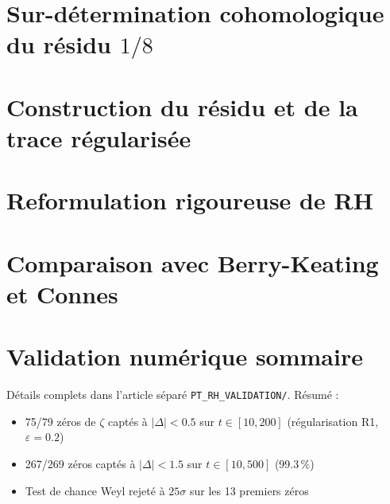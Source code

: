 \documentclass[11pt, a4paper]{article}
\numberwithin{equation}{section}
\begin{document}
\section{Sur-détermination cohomologique du résidu $1/8$}
\label{sec:cohomologie}


\section{Construction du résidu et de la trace régularisée}
\label{sec:trace}


\section{Reformulation rigoureuse de RH}
\label{sec:rh-reformulation}


\section{Comparaison avec Berry-Keating et Connes}
\label{sec:comparaison}


\section{Validation numérique sommaire}
\label{sec:validation}

Détails complets dans l'article séparé \texttt{PT\_RH\_VALIDATION/}.
Résumé :
\begin{itemize}
  \item 75/79 zéros de $\zeta$ captés à $|\Delta| < 0.5$ sur $t \in [10, 200]$
        (régularisation R1, $\varepsilon = 0.2$)
  \item 267/269 zéros captés à $|\Delta| < 1.5$ sur $t \in [10, 500]$ (99.3\,\%)
  \item Test de chance Weyl rejeté à $25\sigma$ sur les 13 premiers zéros
\end{itemize}
\end{document}
